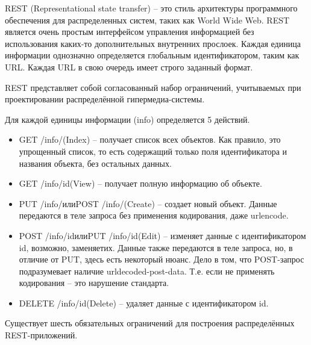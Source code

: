 \documentclass[a4paper,14pt]{article}
\begin{document}
REST (Representational state transfer) – это стиль архитектуры программного обеспечения для распределенных систем, таких как World Wide Web. REST является очень простым интерфейсом управления информацией без использования каких-то дополнительных внутренних прослоек. Каждая единица информации однозначно определяется глобальным идентификатором, таким как URL. Каждая URL в свою очередь имеет строго заданный формат. 

REST представляет собой согласованный набор ограничений, учитываемых при проектировании распределённой гипермедиа-системы.

Для каждой единицы информации (info) определяется 5 действий.

\begin{itemize}
	\item GET /info/(Index) – получает список всех объектов. Как правило, это упрощенный список, то есть содержащий только поля идентификатора и названия объекта, без остальных данных.
	\item GET /info/{id}(View) – получает полную информацию об объекте.
	\item PUT /info/илиPOST /info/(Create) – создает новый объект. Данные передаются в теле запроса без применения кодирования, даже urlencode.
	\item POST /info/{id}илиPUT /info/{id}(Edit) – изменяет данные с идентификатором {id}, возможно, заменяетих. Данные также передаются в теле запроса, но, в отличие от PUT, здесь есть некоторый нюанс. Дело в том, что POST-запрос подразумевает наличие urldecoded-post-data. Т.е. если не применять кодирования – это нарушение стандарта.
	\item DELETE /info/{id}(Delete) – удаляет данные с идентификатором {id}.
\end{itemize}

Существует шесть обязательных ограничений для построения распределённых REST-приложений.
\end{document}
